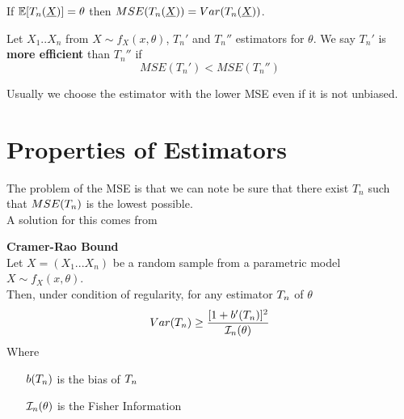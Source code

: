 \begin{oss}
	If $\mathbb{E}[T_n(\underline X)]=\theta$ then $MSE(T_n(\underline X))=Var(T_n(\underline X))$.
\end{oss}
\begin{defi}
	Let $X_1.. X_n$ from $X\sim f_X(x,\theta)$, $T_n'$ and $T_n''$ estimators for $\theta$. We say $T_n'$ is  \textbf{more efficient} than $T_n''$ if
	$$MSE(T_n')<MSE(T_n'')$$
\end{defi}
Usually we choose the estimator with the lower MSE even if it is not unbiased.\\

\section{Properties of Estimators}
The problem of the MSE is that we can note be sure that there exist $T_n$ such that $MSE (T_{n})$ is the lowest possible.\\
A solution for this comes from
\begin{teo}\label{teo:Cramer-Rao Bound}
	\textbf{Cramer-Rao Bound}\\
			Let $X=(X_1... X_n)$ be a random sample from a parametric model $X\sim f_X(x,\theta)$.\\
			Then, under condition of regularity, for any estimator $T_{n}$ of $\theta$ 
			\[
			Var(T_{n})\geq \frac{[1+b'(T_{n})]^2}{\mathcal{I}_n(\theta)}
			\]
Where
\begin{itemize}
	\item[$b(T_{n})$] is the bias of $T_{n}$
	\item[$\mathcal{I}_n(\theta)$] is the Fisher Information
\end{itemize}
\end{teo}
